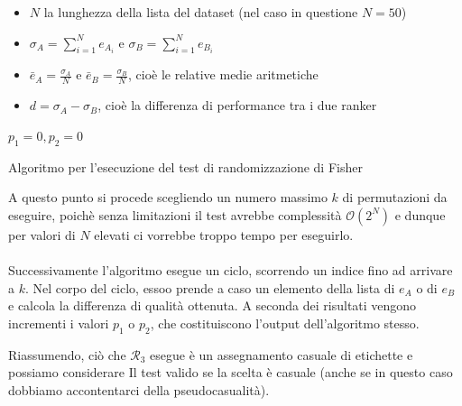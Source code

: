 \begin{itemize}
	\item $N$ la lunghezza della lista del dataset (nel caso in questione $N=50$)
	\item $\sigma_A = \sum_{i=1}^{N} e_{A_i}$ e $\sigma_B = \sum_{i=1}^{N} e_{B_i}$
	\item $\bar{e}_A = \frac{\sigma_{A} }{N}$ e  $\bar{e}_B = \frac{\sigma_{B} }{N}$, cioè le relative medie aritmetiche
	\item $d = \sigma_{A} - \sigma_{B}$, cioè la differenza di performance tra i due ranker
\end{itemize}


\begin{algorithm}[h!]
	\small
	\DontPrintSemicolon
	\BlankLine
	$p_1 = 0, p_2 = 0$\;
	\BlankLine
	
	\label{alg:spectest}
	\caption{Algoritmo per l'esecuzione del test di randomizzazione di Fisher}
\end{algorithm}

A questo punto si procede scegliendo un numero massimo $k$ di permutazioni
da eseguire, poichè  senza limitazioni  il test avrebbe complessità $\mathcal{O}(2^N)$
e dunque per valori di $N$ elevati ci vorrebbe troppo tempo per eseguirlo.
\\
\\
Successivamente l'algoritmo esegue un ciclo, scorrendo un indice fino ad arrivare a $k$.
Nel corpo del ciclo, essoo prende a caso un elemento della lista di $e_A$ o di $e_B$ e
calcola la differenza di qualità ottenuta.
A seconda dei risultati vengono incrementi i valori $p_1$ o $p_2$, che costituiscono
l'output dell'algoritmo stesso.

Riassumendo, ciò che $\mathcal{R}_3$ esegue è un assegnamento casuale di etichette e
possiamo considerare Il test valido se la scelta è casuale (anche se in questo caso
dobbiamo accontentarci della pseudocasualità).

